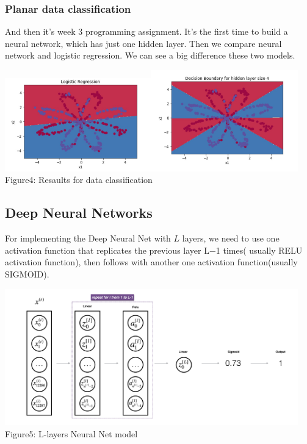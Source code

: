 \documentclass[a4paper]{article}
\begin{document}
\subsubsection{\textbf{Planar data classification}}

And then it's week 3 programming assignment. It's the first time to build a neural network, which has just one hidden layer. Then we compare neural network and logistic regression. We can see a big difference these two models.

\begin{center}
\includegraphics[width=2.5in]{resll.png}\includegraphics[width=2.5in]{resnn.png}\\
Figure4: Resaults for data classification
\end{center}

\subsection{\textbf{Deep Neural Networks}}

For implementing the Deep Neural Net with $L$ layers, we need to use one activation function that replicates the previous layer L−1  times( usually RELU activation function), then follows with another one activation function(usually SIGMOID).

\begin{center}
\includegraphics[width=5in]{NNL.png}\\
Figure5: L-layers Neural Net model
\end{center}
\end{document}
